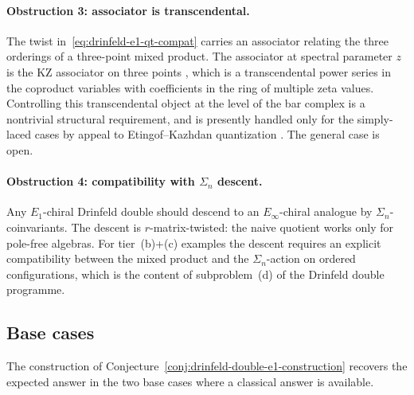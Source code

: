 \paragraph{Obstruction 3: associator is transcendental.}
The twist in~\eqref{eq:drinfeld-e1-qt-compat} carries an
associator relating the three orderings of a three-point
mixed product. The associator at spectral parameter $z$
is the KZ associator on three points
\cite{Drinfeld90}, which is a transcendental power series
in the coproduct variables with coefficients in the ring
of multiple zeta values. Controlling this transcendental
object at the level of the bar complex is a nontrivial
structural requirement, and is presently handled only
for the simply-laced cases by appeal to Etingof--Kazhdan
quantization \cite{etingof1996quantization}. The
general case is open.

\paragraph{Obstruction 4: compatibility with $\Sigma_n$
descent.} Any $E_1$-chiral Drinfeld double should descend
to an $E_\infty$-chiral analogue by $\Sigma_n$-coinvariants.
The descent is $r$-matrix-twisted: the naive
quotient works only for pole-free algebras. For
tier~(b)+(c) examples the descent requires an explicit
compatibility between the mixed product and the
$\Sigma_n$-action on ordered configurations, which is
the content of subproblem~(d) of the Drinfeld double programme.

\subsection{Base cases}
\label{subsec:drinfeld-e1-base-cases}

The construction of
Conjecture~\ref{conj:drinfeld-double-e1-construction}
recovers the expected answer in the two base cases where a
classical answer is available.

